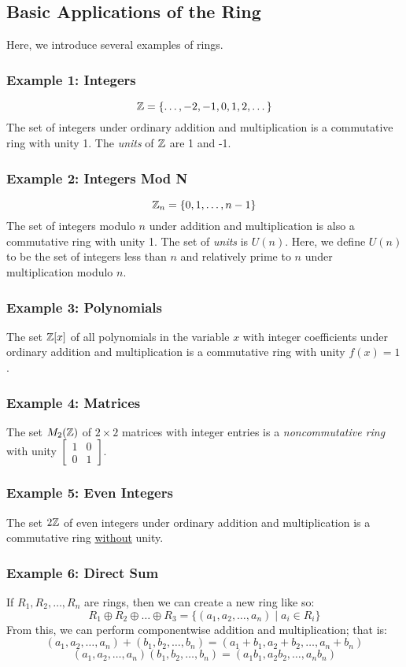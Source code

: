 \documentclass[letterpaper]{article}
\begin{document}
\subsection{Basic Applications of the Ring}
Here, we introduce several examples of rings. 

\subsubsection{Example 1: Integers}
\[\mathbb{Z} = \{\dots, -2, -1, 0, 1, 2, \dots\}\]
The set of integers under ordinary addition and multiplication is a commutative ring with unity 1. The \emph{units} of $\mathbb{Z}$ are 1 and -1.

\subsubsection{Example 2: Integers Mod N}
\[\mathbb{Z}_n = \{0, 1, \dots, n - 1\}\]
The set of integers modulo $n$ under addition and multiplication is also a commutative ring with unity 1. The set of \emph{units} is $U(n)$. Here, we define $U(n)$ to be the set of integers less than $n$ and relatively prime to $n$ under multiplication modulo $n$. 

\subsubsection{Example 3: Polynomials}
The set $\mathbb{Z}[x]$ of all polynomials in the variable $x$ with integer coefficients under ordinary addition and multiplication is a commutative ring with unity $f(x) = 1$.

\subsubsection{Example 4: Matrices}
The set $M_{2}(\mathbb{Z})$ of $2 \times 2$ matrices with integer entries is a \emph{noncommutative ring} with unity $\begin{bmatrix} 1 & 0 \\ 0 & 1 \end{bmatrix}$.

\subsubsection{Example 5: Even Integers}
The set $2\mathbb{Z}$ of even integers under ordinary addition and multiplication is a commutative ring \underline{without} unity. 

\subsubsection{Example 6: Direct Sum}
If $R_1, R_2, \dots, R_n$ are rings, then we can create a new ring like so: 
\[R_1 \oplus R_2 \oplus \dots \oplus R_3 = \{(a_1, a_2, \dots, a_n) \mid a_i \in R_i\}\]
From this, we can perform componentwise addition and multiplication; that is: 
\[(a_1, a_2, \dots, a_n) + (b_1, b_2, \dots, b_n) = (a_1 + b_1, a_2 + b_2, \dots, a_n + b_n)\]
\[(a_1, a_2, \dots, a_n)(b_1, b_2, \dots, b_n) = (a_1 b_1, a_2 b_2, \dots, a_n b_n)\]
\end{document}
